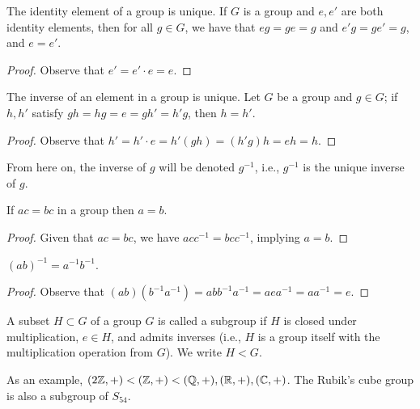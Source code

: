 \begin{simplethm}
    The identity element of a group is unique. If $G$ is a group and $e, e'$ are both identity elements, then for all $g \in G$, we have that $eg = ge = g$ and $e'g = ge' = g$, and $e = e'$.
\end{simplethm}
\begin{proof}
    Observe that $e' = e' \cdot e = e$.
\end{proof}
\begin{simplethm}
    The inverse of an element in a group is unique. Let $G$ be a group and $g \in G$; if $h, h'$ satisfy $gh = hg = e = gh' = h'g$, then $h = h'$.
\end{simplethm}
\begin{proof}
    Observe that $h' = h' \cdot e = h' (gh) = (h' g) h = eh = h$.
\end{proof}
\noindent From here on, the inverse of $g$ will be denoted $g^{-1}$, i.e., $g^{-1}$ is the unique inverse of $g$.
\begin{simplethm}
    If $ac = bc$ in a group then $a = b$.
\end{simplethm}
\begin{proof}
    Given that $ac = bc$, we have $ac c^{-1} = bc c^{-1}$, implying $a = b$.
\end{proof}
\begin{simplethm}
    $(ab)^{-1} = a^{-1} b^{-1}$.
\end{simplethm}
\begin{proof}
    Observe that $(ab) (b^{-1}a^{-1}) = abb^{-1}a^{-1} = aea^{-1} = aa^{-1} = e$.
\end{proof}
\begin{definition}
    A subset $H \subset G$ of a group $G$ is called a subgroup if $H$ is closed under multiplication, $e \in H$, and admits inverses (i.e., $H$ is a group itself with the multiplication operation from $G$). We write $H < G$.
\end{definition}
\noindent As an example, $(2 \mathbb Z, +) < (\mathbb Z, +) < (\mathbb Q, +), (\mathbb R, +), (\mathbb C, +)$. The Rubik's cube group is also a subgroup of $S_{54}$.